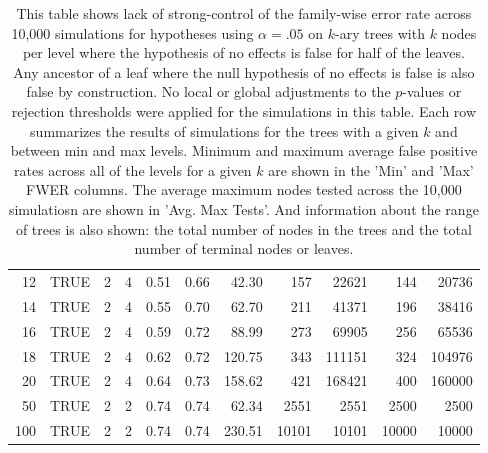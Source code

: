 \begin{table}[H]
\begin{tabular}{rlrrrrrrrrr}
   12 & TRUE &   2 &   4 & 0.51 & 0.66 & 42.30 & 157 & 22621 & 144 & 20736 \\ 
   14 & TRUE &   2 &   4 & 0.55 & 0.70 & 62.70 & 211 & 41371 & 196 & 38416 \\ 
   16 & TRUE &   2 &   4 & 0.59 & 0.72 & 88.99 & 273 & 69905 & 256 & 65536 \\ 
   18 & TRUE &   2 &   4 & 0.62 & 0.72 & 120.75 & 343 & 111151 & 324 & 104976 \\ 
   20 & TRUE &   2 &   4 & 0.64 & 0.73 & 158.62 & 421 & 168421 & 400 & 160000 \\ 
   50 & TRUE &   2 &   2 & 0.74 & 0.74 & 62.34 & 2551 & 2551 & 2500 & 2500 \\ 
  100 & TRUE &   2 &   2 & 0.74 & 0.74 & 230.51 & 10101 & 10101 & 10000 & 10000 \\ 
   \bottomrule
\end{tabular}
\caption{This table shows lack of strong-control
  of the family-wise error rate across 10,000 simulations for hypotheses using
  $\alpha=.05$ on $k$-ary trees with $k$ nodes per level where the hypothesis
  of no effects is false for half of the leaves. Any ancestor of a leaf where
  the null hypothesis of no effects is false is also false by construction. No
  local or global adjustments to the $p$-values or rejection thresholds were
  applied for the simulations in this table. Each row summarizes the results of
  simulations for the trees with a given $k$ and between min and max levels.
  Minimum and maximum average false positive rates across all of the levels for
  a given $k$ are shown in the 'Min' and 'Max' FWER columns. The average
  maximum nodes tested across the 10,000 simulatiosn are shown in 'Avg. Max
  Tests'. And information about the range of trees is also shown: the total
  number of nodes in the trees and the total number of terminal nodes or
  leaves.} 
\label{tab:strong_control_naive}
\end{table}
